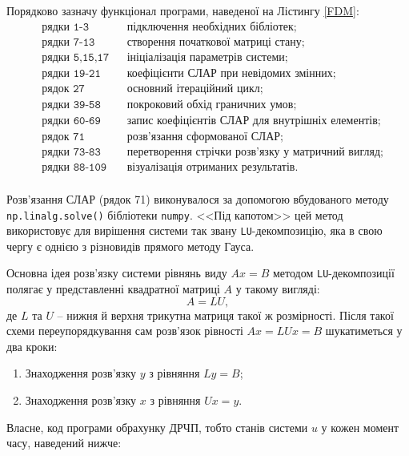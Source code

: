 \documentclass[a4paper,14pt]{extarticle} %
\begin{document}
Порядково зазначу функціонал програми, наведеної на Лістингу \ref{FDM}:
\begin{align*}
    &\texttt{рядки 1-3} && \text{підключення необхідних бібліотек;} \\
    &\texttt{рядки 7-13} && \text{створення початкової матриці стану;} \\
    &\texttt{рядки 5,15,17} && \text{ініціалізація параметрів системи;} \\
    &\texttt{рядки 19-21} && \text{коефіцієнти СЛАР при невідомих змінних;} \\
    &\texttt{рядок 27} && \text{основний ітераційний цикл;} \\
    &\texttt{рядки 39-58} && \text{покроковий обхід граничних умов;} \\
    &\texttt{рядки 60-69} && \text{запис коефіцієнтів СЛАР для внутрішніх елементів;} \\
    &\texttt{рядок 71} && \text{розв'язання сформованої СЛАР;} \\
    &\texttt{рядки 73-83} && \text{перетворення стрічки розв'язку у матричний вигляд;} \\
    &\texttt{рядки 88-109} && \text{візуалізація отриманих результатів.} \\
\end{align*}

Розв'язання СЛАР (рядок 71) виконувалося за допомогою вбудованого методу \texttt{np.linalg.solve()} бібліотеки 
\texttt{numpy}. <<Під капотом>> цей метод використовує для вирішення системи так звану \texttt{LU}-декомпозицію, 
яка в свою чергу є однією з різновидів прямого методу Гауса.

Основна ідея розв'язку системи рівнянь виду $Ax=B$ методом \texttt{LU}-декомпозиції полягає у представленні 
квадратної матриці $A$ у такому вигляді:
\[ A=LU, \]
де $L$ та $U$ -- нижня й верхня трикутна матриця такої ж розмірності. Після такої схеми переупорядкування сам 
розв'язок рівності $Ax=LUx=B$ шукатиметься у два кроки:
\begin{enumerate}
    \item Знаходження розв'язку $y$ з рівняння $Ly=B$;
    \item Знаходження розв'язку $x$ з рівняння $Ux=y$.
\end{enumerate}

Власне, код програми обрахунку ДРЧП, тобто станів системи $u$ у кожен момент часу, наведений нижче:


\end{document}
